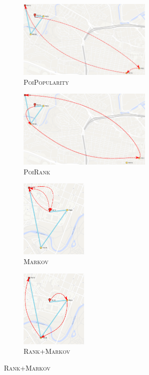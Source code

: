 \documentclass{article}
\begin{document}
\begin{figure}
    \centering
    \begin{subfigure}[b]{2.6in}
        \includegraphics[height=1.5in]{poi_popularity.eps}
        \caption{\textsc{PoiPopularity}}
    \end{subfigure}
    \begin{subfigure}[b]{2.6in}
        \includegraphics[height=1.5in]{poi_rank.eps}
        \caption{\textsc{PoiRank}}
    \end{subfigure}
    \begin{subfigure}[b]{1.32in}
        \includegraphics[height=1.5in]{markov.eps}
        \caption{\textsc{Markov}}
    \end{subfigure}
    \begin{subfigure}[b]{1.32in}
        \includegraphics[height=1.5in]{rank_markov.eps}
        \caption{\textsc{Rank+Markov}}
    \end{subfigure}
\end{figure}
\end{document}
